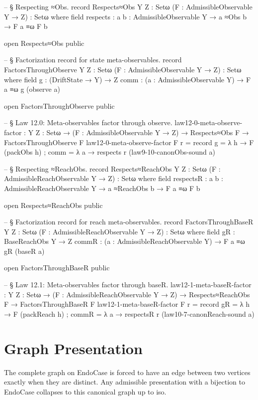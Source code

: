 \documentclass[11pt,a4paper]{book}
\def\texttt#1{#1}%
\begin{document}
\begin{code}
-- § Respecting ≈Obs.
record Respects≈Obs {Y Z : Setω} (F : AdmissibleObservable Y → Z) : Setω where
  field
    respects : {a b : AdmissibleObservable Y} → a ≈Obs b → F a ≡ω F b

open Respects≈Obs public

-- § Factorization record for state meta-observables.
record FactorsThroughObserve {Y Z : Setω} (F : AdmissibleObservable Y → Z) : Setω where
  field
    g    : (DriftState → Y) → Z
    comm : (a : AdmissibleObservable Y) → F a ≡ω g (observe a)

open FactorsThroughObserve public

-- § Law 12.0: Meta-observables factor through observe.
law12-0-meta-observe-factor :
  {Y Z : Setω} →
  (F : AdmissibleObservable Y → Z) →
  Respects≈Obs F →
  FactorsThroughObserve F
law12-0-meta-observe-factor F r =
  record
    { g = λ h → F (packObs h)
    ; comm = λ a →
        respects r (law9-10-canonObs-sound a)
    }

-- § Respecting ≈ReachObs.
record Respects≈ReachObs {Y Z : Setω} (F : AdmissibleReachObservable Y → Z) : Setω where
  field
    respectsR : {a b : AdmissibleReachObservable Y} → a ≈ReachObs b → F a ≡ω F b

open Respects≈ReachObs public

-- § Factorization record for reach meta-observables.
record FactorsThroughBaseR {Y Z : Setω} (F : AdmissibleReachObservable Y → Z) : Setω where
  field
    gR    : BaseReachObs Y → Z
    commR : (a : AdmissibleReachObservable Y) → F a ≡ω gR (baseR a)

open FactorsThroughBaseR public

-- § Law 12.1: Meta-observables factor through baseR.
law12-1-meta-baseR-factor :
  {Y Z : Setω} →
  (F : AdmissibleReachObservable Y → Z) →
  Respects≈ReachObs F →
  FactorsThroughBaseR F
law12-1-meta-baseR-factor F r =
  record
    { gR = λ h → F (packReach h)
    ; commR = λ a →
        respectsR r (law10-7-canonReach-sound a)
    }
\end{code}

\chapter{Graph Presentation}

The complete graph on \texttt{EndoCase} is forced to have an edge between two vertices exactly when they are distinct. Any admissible presentation with a bijection to \texttt{EndoCase} collapses to this canonical graph up to iso.
\end{document}
